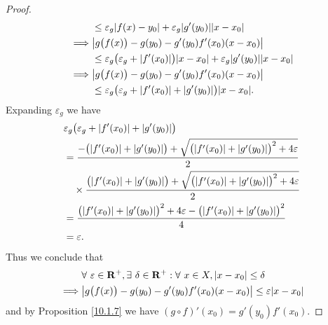 \begin{proof}
\begin{align*}
                 & \leq \varepsilon_g \abs*{f(x) - y_0} + \varepsilon_g \abs*{g'(y_0)} \abs*{x - x_0}                                       \\
        \implies & \abs*{g\big(f(x)\big) - g(y_0) - g'(y_0) f'(x_0) (x - x_0)}                                                              \\
                 & \leq \varepsilon_g \big(\varepsilon_g + \abs*{f'(x_0)}\big) \abs*{x - x_0} + \varepsilon_g \abs*{g'(y_0)} \abs*{x - x_0} \\
        \implies & \abs*{g\big(f(x)\big) - g(y_0) - g'(y_0) f'(x_0) (x - x_0)}                                                              \\
                 & \leq \varepsilon_g \big(\varepsilon_g + \abs*{f'(x_0)} + \abs*{g'(y_0)}\big) \abs*{x - x_0}.
    \end{align*}
    Expanding \(\varepsilon_g\) we have
    \begin{align*}
         & \varepsilon_g \big(\varepsilon_g + \abs*{f'(x_0)} + \abs*{g'(y_0)}\big)                                                               \\
         & = \frac{-\big(\abs*{f'(x_0)} + \abs*{g'(y_0)}\big) + \sqrt{\big(\abs*{f'(x_0)} + \abs*{g'(y_0)}\big)^2 + 4 \varepsilon}}{2}           \\
         & \quad \times \frac{\big(\abs*{f'(x_0)} + \abs*{g'(y_0)}\big) + \sqrt{\big(\abs*{f'(x_0)} + \abs*{g'(y_0)}\big)^2 + 4 \varepsilon}}{2} \\
         & = \frac{\big(\abs*{f'(x_0)} + \abs*{g'(y_0)}\big)^2 + 4 \varepsilon - \big(\abs*{f'(x_0)} + \abs*{g'(y_0)}\big)^2}{4}                 \\
         & = \varepsilon.
    \end{align*}
    Thus we conclude that
    \begin{align*}
                 & \forall\ \varepsilon \in \mathbf{R}^+, \exists\ \delta \in \mathbf{R}^+ : \forall\ x \in X, \abs*{x - x_0} \leq \delta \\
        \implies & \abs*{g\big(f(x)\big) - g(y_0) - g'(y_0) f'(x_0) (x - x_0)} \leq \varepsilon \abs*{x - x_0}
    \end{align*}
    and by Proposition \ref{10.1.7} we have \((g \circ f)'(x_0) = g'(y_0) f'(x_0)\).
\end{proof}

